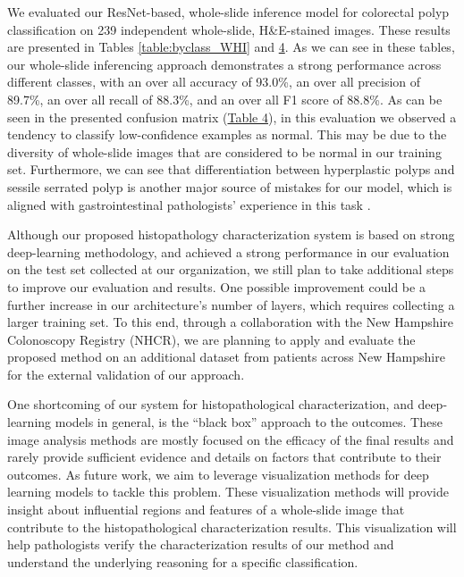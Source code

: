 \documentclass[review]{elsarticle}
\begin{document}
We evaluated our ResNet-based, whole-slide inference model for colorectal polyp classification on 239 independent whole-slide, H\&E-stained images. These results are presented in Tables \ref{table:byclass_WHI} and \hyperref[table:conf]{4}. As we can see in these tables, our whole-slide inferencing approach demonstrates a strong performance across different classes, with an over all accuracy of 93.0\%, an over all precision of 89.7\%, an over all recall of 88.3\%, and an over all F1 score of 88.8\%. As can be seen in the presented confusion matrix (\hyperref[table:conf]{Table 4}), in this evaluation we observed a tendency to classify low-confidence examples as normal. This may be due to the diversity of whole-slide images that are considered to be normal in our training set. Furthermore, we can see that differentiation between hyperplastic polyps and sessile serrated polyp is another major source of mistakes for our model, which is aligned with gastrointestinal pathologists' experience in this task \citep{vu2011individuals, irshad2014methods, veta2015assessment}.

Although our proposed histopathology characterization system is based on strong deep-learning methodology, and achieved a strong performance in our evaluation on the test set collected at our organization, we still plan to take additional steps to improve our evaluation and results. One possible improvement could be a further increase in our architecture's number of layers, which requires collecting a larger training set. To this end, through a collaboration with the New Hampshire Colonoscopy Registry (NHCR), we are planning to apply and evaluate the proposed method on an additional dataset from patients across New Hampshire for the external validation of our approach.

One shortcoming of our system for histopathological characterization, and deep-learning models in general, is the “black box” approach to the outcomes. These image analysis methods are mostly focused on the efficacy of the final results and rarely provide sufficient evidence and details on factors that contribute to their outcomes. As future work, we aim to leverage visualization methods for deep learning models to tackle this problem. These visualization methods will provide insight about influential regions and features of a whole-slide image that contribute to the histopathological characterization results. This visualization will help pathologists verify the characterization results of our method and understand the underlying reasoning for a specific classification.
\end{document}
